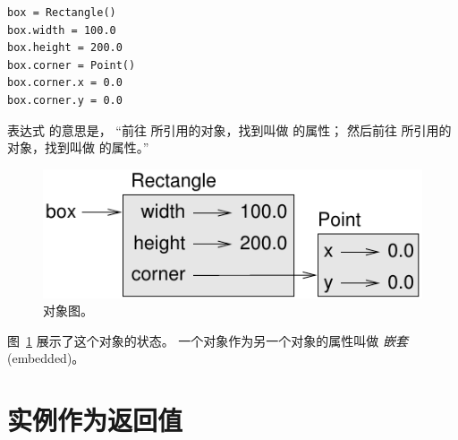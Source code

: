\begin{lstlisting}
box = Rectangle()
box.width = 100.0
box.height = 200.0
box.corner = Point()
box.corner.x = 0.0
box.corner.y = 0.0
\end{lstlisting}

%

表达式  的意思是，
``前往  所引用的对象，找到叫做  的属性；
然后前往  所引用的对象，找到叫做  的属性。''

\begin{figure}
\centerline
{\includegraphics[scale=0.8]{../source/figs/rectangle.pdf}}
\caption{对象图。}
\label{fig.rectangle}
\end{figure}


图~\ref{fig.rectangle} 展示了这个对象的状态。
一个对象作为另一个对象的属性叫做 {\em 嵌套} (embedded)。
  
  
  


\section{实例作为返回值}
  


